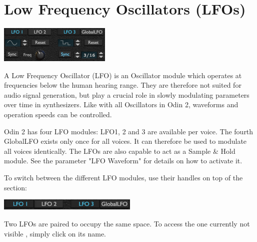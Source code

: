 


\section{Low Frequency Oscillators (LFOs)}
\label{LFOs}

\begin{center}
    \includegraphics[width=0.4\textwidth]{graphics/LFOs.png}
\end{center}

A Low Frequency Oscillator (LFO) is an Oscillator module which operates at frequencies below the human hearing range. They are therefore not suited for audio signal generation, but play a crucial role in slowly modulating parameters over time in synthesizers. Like with all Oscillators in Odin 2, waveforms and operation speeds can be controlled.

Odin 2 has four LFO modules: LFO1, 2 and 3 are available per voice. The fourth GlobalLFO exists only once for all voices. It can therefore be used to modulate all voices identically. The LFOs are also capable to act as a Sample \& Hold module. See the parameter "LFO Waveform" for details on how to activate it.

To switch between the different LFO modules, use their handles on top of the section:
\begin{center}
    \includegraphics[width=0.5\textwidth]{graphics/LFO_handles.png}
\end{center}
Two LFOs are paired to occupy the same space. To access the one currently not visible , simply click on its name.

